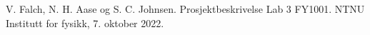 \documentclass[5p]{elsarticle}
\begin{document}

\begin{thebibliography}{5}
V. Falch, N. H. Aase og S. C. Johnsen. Prosjektbeskrivelse Lab 3 FY1001. NTNU Institutt for fysikk, 7. oktober 2022.
\end{thebibliography}
\end{document}
